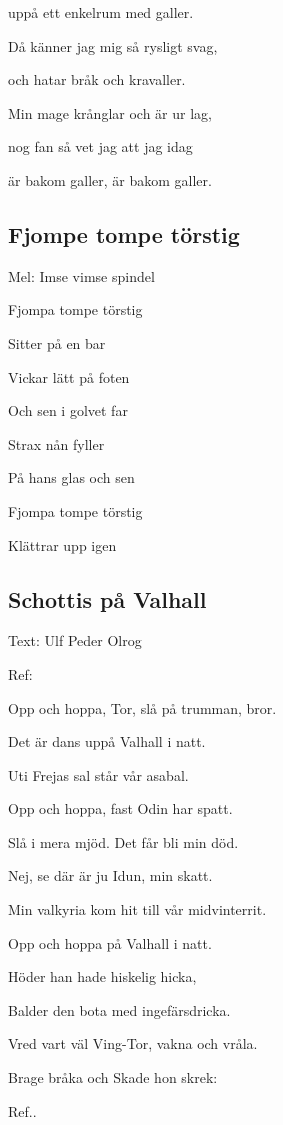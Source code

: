 uppå ett enkelrum med galler.

Då känner jag mig så rysligt svag,

och hatar bråk och kravaller.

Min mage krånglar och är ur lag,

nog fan så vet jag att jag idag

är bakom galler, är bakom galler. \bigskip

\subsection{\textbf{Fjompe tompe törstig}}

Mel: Imse vimse spindel \bigskip

Fjompa tompe törstig

Sitter på en bar

Vickar lätt på foten

Och sen i golvet far

Strax nån fyller

På hans glas och sen

Fjompa tompe törstig

Klättrar upp igen 

\subsection{\textbf{Schottis på Valhall}}

Text: Ulf Peder Olrog\bigskip

Ref:

Opp och hoppa, Tor, slå på trumman, bror.

Det är dans uppå Valhall i natt.

Uti Frejas sal står vår asabal.

Opp och hoppa, fast Odin har spatt.

Slå i mera mjöd. Det får bli min död.

Nej, se där är ju Idun, min skatt.

Min valkyria kom hit till vår midvinterrit.

Opp och hoppa på Valhall i natt.\bigskip

Höder han hade hiskelig hicka,

Balder den bota med ingefärsdricka.

Vred vart väl Ving-Tor, vakna och vråla.

Brage bråka och Skade hon skrek:\bigskip

Ref..\bigskip

